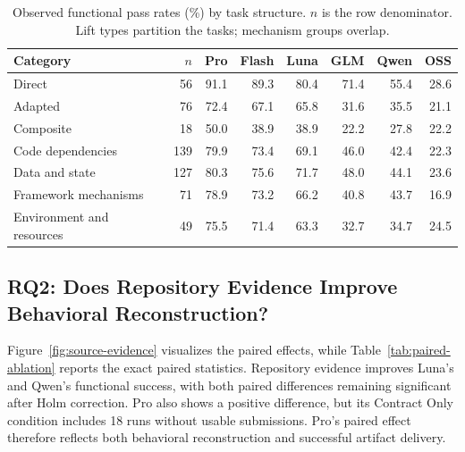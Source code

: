 \documentclass[acmsmall,screen,review,anonymous]{acmart}
\begin{document}
\begin{table}[htb]
  \centering
  \footnotesize
  \caption{Observed functional pass rates (\%) by task structure. $n$ is the row denominator. Lift types partition the tasks; mechanism groups overlap.}
  \label{tab:structure}
  \setlength{\tabcolsep}{4.2pt}
  \renewcommand{\arraystretch}{1.10}
  \begin{tabular}{@{}lrrrrrrr@{}}
    \toprule
    Category & $n$ & Pro & Flash & Luna & GLM & Qwen & OSS \\
    \midrule
    Direct & 56 & 91.1 & 89.3 & 80.4 & 71.4 & 55.4 & 28.6 \\
    Adapted & 76 & 72.4 & 67.1 & 65.8 & 31.6 & 35.5 & 21.1 \\
    Composite & 18 & 50.0 & 38.9 & 38.9 & 22.2 & 27.8 & 22.2 \\
    \midrule
    Code dependencies & 139 & 79.9 & 73.4 & 69.1 & 46.0 & 42.4 & 22.3 \\
    Data and state & 127 & 80.3 & 75.6 & 71.7 & 48.0 & 44.1 & 23.6 \\
    Framework mechanisms & 71 & 78.9 & 73.2 & 66.2 & 40.8 & 43.7 & 16.9 \\
    Environment and resources & 49 & 75.5 & 71.4 & 63.3 & 32.7 & 34.7 & 24.5 \\
    \bottomrule
  \end{tabular}
\end{table}

\subsection{RQ2: Does Repository Evidence Improve Behavioral Reconstruction?}
\label{sec:rq2}
\label{sec:source-ablation-results}

Figure~\ref{fig:source-evidence} visualizes the paired effects, while
Table~\ref{tab:paired-ablation} reports the exact paired statistics.
Repository evidence improves Luna's and Qwen's functional success, with both
paired differences remaining significant after Holm correction. Pro also shows
a positive difference, but its Contract Only condition includes 18 runs without
usable submissions. Pro's paired effect therefore reflects both behavioral
reconstruction and successful artifact delivery.
\end{document}

